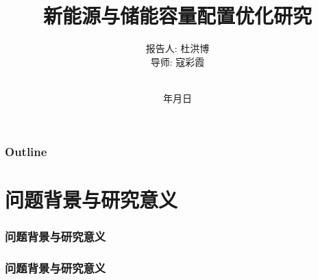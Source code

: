 \documentclass{beamer}
\renewcommand{\today}{\number\year 年\number\month 月\number\day 日}
\begin{document}
\title[新能源与储能容量配置优化研究]%
{新能源与储能容量配置优化研究}

\author[杜洪博]%
{报告人: 杜洪博\\
导\quad 师: 寇彩霞\rule[0pt]{0pt}{20pt}\\}

\institute[BUPT]{\textcolor[rgb]{0.0,0.0,0.10}%
{\small\ttfamily 北京邮电大学\ 理学院\\[10pt]}}

\date{\today}

\begin{frame}[plain]
	\titlepage
\end{frame}

\begin{frame}
	\frametitle{Outline}
	\tableofcontents[hideallsubsections] %
\end{frame}

\AtBeginSection[] %
{ \begin{frame}<beamer> %
		\tableofcontents[currentsection,hideallsubsections]%
	\end{frame}
}





\section{问题背景与研究意义}

\begin{frame}
	\frametitle{\bf 问题背景与研究意义} 
	
\end{frame}

\begin{frame}
	\frametitle{\bf 问题背景与研究意义} 

\end{frame}
\end{document}
